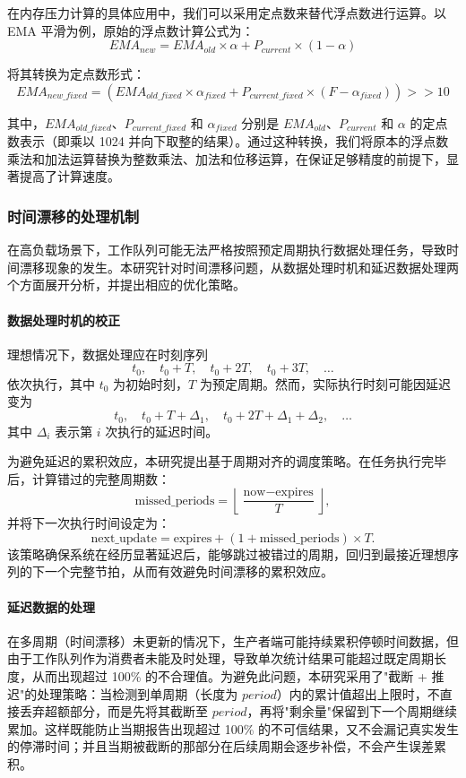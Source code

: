 在内存压力计算的具体应用中，我们可以采用定点数来替代浮点数进行运算。以 EMA 平滑为例，原始的浮点数计算公式为：
\[
EMA_{new} = EMA_{old} \times \alpha + P_{current} \times (1 - \alpha)
\]

将其转换为定点数形式：
\[
EMA_{new\_fixed} = (EMA_{old\_fixed} \times \alpha_{fixed} + P_{current\_fixed} \times (F - \alpha_{fixed})) >> 10
\]

其中，\(EMA_{old\_fixed}\)、\(P_{current\_fixed}\) 和 \(\alpha_{fixed}\) 分别是 \(EMA_{old}\)、\(P_{current}\) 和 \(\alpha\) 的定点数表示（即乘以 1024 并向下取整的结果）。通过这种转换，我们将原本的浮点数乘法和加法运算替换为整数乘法、加法和位移运算，在保证足够精度的前提下，显著提高了计算速度。

\subsubsection{时间漂移的处理机制}

在高负载场景下，工作队列可能无法严格按照预定周期执行数据处理任务，导致时间漂移现象的发生。本研究针对时间漂移问题，从数据处理时机和延迟数据处理两个方面展开分析，并提出相应的优化策略。

\paragraph{数据处理时机的校正}
理想情况下，数据处理应在时刻序列
\[
t_0, \quad t_0 + T, \quad t_0 + 2T, \quad t_0 + 3T, \quad \dots
\]
依次执行，其中 \(t_0\) 为初始时刻，\(T\) 为预定周期。然而，实际执行时刻可能因延迟变为
\[
t_0, \quad t_0 + T + \Delta_1, \quad t_0 + 2T + \Delta_1 + \Delta_2, \quad \dots
\]
其中 \(\Delta_i\) 表示第 \(i\) 次执行的延迟时间。

为避免延迟的累积效应，本研究提出基于周期对齐的调度策略。在任务执行完毕后，计算错过的完整周期数：
\[
\text{missed\_periods} = \left\lfloor \frac{\text{now} - \text{expires}}{T} \right\rfloor,
\]
并将下一次执行时间设定为：
\[
\text{next\_update} = \text{expires} + (1 + \text{missed\_periods}) \times T.
\]
该策略确保系统在经历显著延迟后，能够跳过被错过的周期，回归到最接近理想序列的下一个完整节拍，从而有效避免时间漂移的累积效应。

\paragraph{延迟数据的处理}

在多周期（时间漂移）未更新的情况下，生产者端可能持续累积停顿时间数据，但由于工作队列作为消费者未能及时处理，导致单次统计结果可能超过既定周期长度，从而出现超过 100\% 的不合理值。为避免此问题，本研究采用了"截断 + 推迟"的处理策略：当检测到单周期（长度为 \(\textit{period}\)）内的累计值超出上限时，不直接丢弃超额部分，而是先将其截断至 \(\textit{period}\)，再将"剩余量"保留到下一个周期继续累加。这样既能防止当期报告出现超过 100\% 的不可信结果，又不会漏记真实发生的停滞时间；并且当期被截断的那部分在后续周期会逐步补偿，不会产生误差累积。

